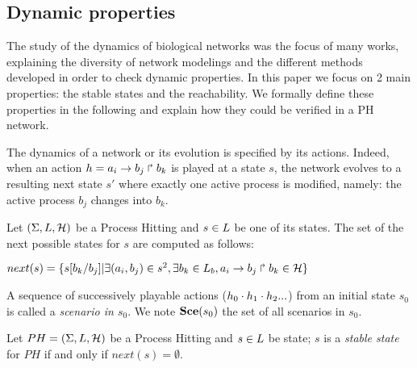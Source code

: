 \subsection*{Dynamic properties}

The study of the dynamics of biological networks was the focus of many works, explaining the diversity of network modelings and the different methods developed in order to check dynamic properties.
In this paper we focus on 2 main properties: the stable states and the reachability.
We formally define these properties in the following and explain how they could be verified in a PH network.

The dynamics of a network or its evolution is specified by its actions.
Indeed, when an action $h = a_i\rightarrow b_j\Rsh b_k$ is played at a state $s$,
the network evolves to a resulting next state $s'$ where exactly one active process
is modified, namely: the active process $b_j$ changes into $b_k$.

 

\begin{definition}
\label{def:NextState}
Let $(\Sigma,L,\mathcal{H})$ be a Process Hitting and $s \in L$ be
one of its states. The set of the next possible states for $s$ are computed as follows:
\begin{center}
$next(s) = \{s[b_k /b_j ]| \exists (a_i , b_j ) \in s^2 , \exists b_k \in L_b , a_i\rightarrow b_j\Rsh b_k \in \mathcal{H}\}$
\end{center}
 
\end{definition}

A sequence of successively playable actions ($h_0 \cdot h_1 \cdot h_2...$)
from an initial state $s_0$ is called a \emph{scenario in $s_0$}.
We note $\mathbf{Sce}(s_0)$ the set of all scenarios in $s_0$.


\begin{definition}
\label{def:FixPoint1}
Let $PH = (\Sigma,L,\mathcal{H})$ be a Process Hitting and
$s \in L$ be state;
$s$ is a \emph{stable state} for $PH$ if and only if $next(s) = \emptyset $.
 
\end{definition}

